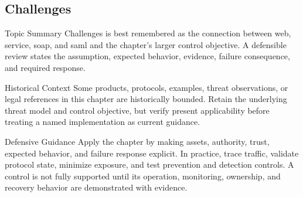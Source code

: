 \documentclass[11pt,letterpaper]{article}
\begin{document}
\subsection*{Challenges}
\begin{CornellNotesTable}
\end{CornellNotesTable}
\begin{CornellSummaryBox}{Topic Summary}
Challenges is best remembered as the connection between web, service, soap, and saml and the chapter's larger control objective. A defensible review states the assumption, expected behavior, evidence, failure consequence, and required response.
\end{CornellSummaryBox}
\begin{CornellWarningBox}{Historical Context}
Some products, protocols, examples, threat observations, or legal references in this chapter are historically bounded. Retain the underlying threat model and control objective, but verify present applicability before treating a named implementation as current guidance.
\end{CornellWarningBox}
\begin{CornellOverviewBox}{Defensive Guidance}
Apply the chapter by making assets, authority, trust, expected behavior, and failure response explicit. In practice, trace traffic, validate protocol state, minimize exposure, and test prevention and detection controls. A control is not fully supported until its operation, monitoring, ownership, and recovery behavior are demonstrated with evidence.
\end{CornellOverviewBox}
\end{document}
